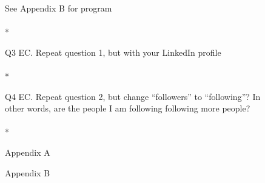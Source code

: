 \documentclass{article}
\begin{document}
See Appendix B for program\\
\\*

Q3 EC. Repeat question 1, but with your LinkedIn profile\\
\\*

Q4 EC. Repeat question 2, but change ``followers'' to ``following''?  In\\
other words, are the people I am following following more people?\\
\\*

\appendix
\newpage
Appendix A


\newpage
Appendix B

\end{document}
